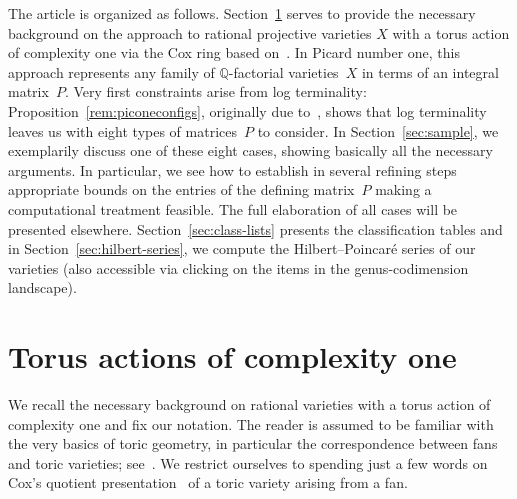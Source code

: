 \documentclass[pdftex]{sigma}%
\theoremstyle{definition}
\def\QQ{{\mathbb Q}}
\numberwithin{equation}{section}
\begin{document}
The article is organized as follows.
Section~\ref{sec:tvar} serves to provide
the necessary background on the approach
to rational projective varieties $X$
with a torus action of complexity one
via the Cox ring
based on~\cite{HaHe,HaSu}.
In Picard number one, this approach
represents any family of $\QQ$-factorial
varieties~$X$ in terms of an integral
matrix~$P$.
Very first constraints arise from
log terminality:
Proposition~\ref{rem:piconeconfigs},
originally due to~\cite{BeHaHuNi},
shows that log terminality leaves us
with eight types of matrices~$P$
to consider.
In Section~\ref{sec:sample}, we exemplarily
discuss one of these eight cases,
showing basically all the necessary
arguments.
In particular, we see how to establish
in several refining steps appropriate
bounds on the entries of the defining
matrix~$P$ making a computational
treatment feasible.
The full elaboration of all cases will
be presented elsewhere.
Section~\ref{sec:class-lists} presents
the classification
tables and in Section~\ref{sec:hilbert-series},
we compute the Hilbert--Poincar\'{e} series of our
varieties (also accessible via clicking on
the items in the genus-codimension
landscape).


\section{Torus actions of complexity one}
\label{sec:tvar}

We recall the necessary background on rational
varieties with a torus action of complexity one
and fix our notation.
The reader is assumed to be familiar with the
very basics of toric geometry, in particular
the correspondence between fans and toric
varieties; see~\cite{CoLiSc,Dan,Ful}.
We restrict ourselves to spending just a few
words on Cox's quotient presentation~\cite{Cox}
of a toric variety arising from a fan.
\end{document}
